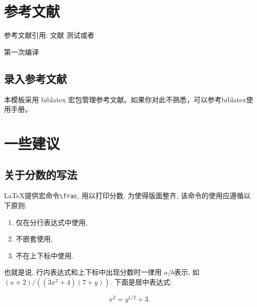 \section{参考文献} \label{manual:ref}
参考文献引用:
\cite{ChenCheChen2001,Nadkarni-1992,Hua-Wang-1973}
文献\cite{JiangXiZhou,Timoshenko,Zhang-Wang}
\cite{ZhuKeZhen}
测试\cite{PQEMU}或者\cite{li1988ivy}

第一次编译\cite{hong2012hqemu}\cite{zaharia2010spark}\cite{wenwenasplos2018}

\subsection{录入参考文献}

本模板采用 biblatex 宏包管理参考文献。如果你对此不熟悉，可以参考biblatex使用手册。



\section{一些建议}
\subsection{关于分数的写法}


\LaTeX 提供宏命令\verb+\frac+, 用以打印分数. 为使得版面整齐, 该命令的使用应遵循以下原则:

\begin{enumerate}
\item 仅在分行表达式中使用,
\item 不嵌套使用,
\item 不在上下标中使用.
\end{enumerate}

也就是说, 行内表达式和上下标中出现分数时一律用 $a/b$表示, 如
$(x+2)/((3x^2+4)(7+y))$. 下面是居中表达式:

\[
 x^2 = y^{1/2} +3.
\]

